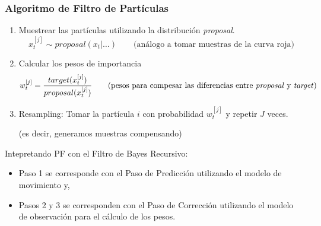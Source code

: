 \begin{frame}
    \frametitle{Algoritmo de Filtro de Partículas}

    \begin{enumerate}
        \item Muestrear las partículas utilizando la distribución \emph{proposal}.
        \begin{equation*}
            x_{t}^{[j]} \sim proposal(x_{t} | \ldots) \qquad \text{(análogo a tomar muestras de la curva roja)}
        \end{equation*}
        \item Calcular los pesos de importancia
        \begin{equation*}
            w_t^{[j]} = \frac{target(x_t^{[j]})}{proposal(x_t^{[j]})} \qquad \text{{(pesos para compesar las diferencias entre \emph{proposal} y \emph{target})}}
        \end{equation*}
        \item Resampling: Tomar la partícula $i$ con probabilidad $w_{t}^{[j]}$ y repetir $J$ veces.

        
        (es decir, generamos muestras compensando)
    \end{enumerate}

    \vspace{1cm}

    Intepretando PF con el Filtro de Bayes Recursivo:
    \begin{itemize}
        \item Paso 1 se corresponde con el Paso de Predicción utilizando el modelo de movimiento y,
        \item Pasos 2 y 3 se corresponden con el Paso de Corrección utilizando el modelo de observación para el cálculo de los pesos.
    \end{itemize}

\end{frame}


